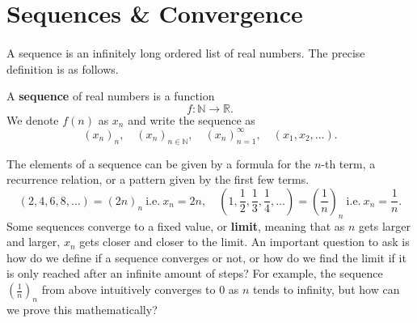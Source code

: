 \documentclass[../real_analysis.tex]{subfiles}
\begin{document}
    \section{Sequences \& Convergence}
        \paragraph{}
        A sequence is an infinitely long ordered list of real numbers. The precise definition is as follows.
        \begin{definition}
            A \textbf{sequence} of real numbers is a function
            \[f:\mathbb{N}\to\mathbb{R}.\]
            We denote $f(n)$ as $x_n$ and write the sequence as
            \[(x_n)_n,\quad(x_n)_{n\in\mathbb{N}},\quad(x_n)_{n=1}^\infty,\quad(x_1,x_2,\dots).\]
        \end{definition}
        The elements of a sequence can be given by a formula for the $n$-th term, a recurrence relation, or a pattern given by the first few terms.
        \begin{equation*}
            (2,4,6,8,\dots)=(2n)_n\ \mathrm{i.e.}\ x_n=2n,\quad\left(1,\frac{1}{2},\frac{1}{3},\frac{1}{4},\dots\right)=\left(\frac{1}{n}\right)_n\ \mathrm{i.e.}\ x_n=\frac{1}{n}.
        \end{equation*}
        Some sequences converge to a fixed value, or \textbf{limit}, meaning that as $n$ gets larger and larger, $x_n$ gets closer and closer to the limit. An important question to ask is how do we define if a sequence converges or not, or how do we find the limit if it is only reached after an infinite amount of steps? For example, the sequence $\left(\frac{1}{n}\right)_n$ from above intuitively converges to 0 as $n$ tends to infinity, but how can we prove this mathematically?
\end{document}
